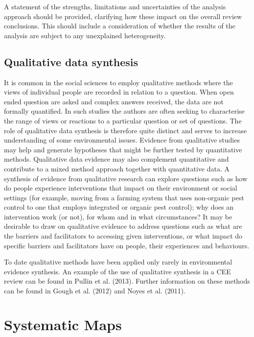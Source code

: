 \documentclass[
  letterpaper,
  DIV=11,
  numbers=noendperiod]{scrreprt}
\begin{document}
A statement of the strengths, limitations and uncertainties of the
analysis approach should be provided, clarifying how these impact on the
overall review conclusions. This should include a consideration of
whether the results of the analysis are subject to any unexplained
heterogeneity.

\subsection{Qualitative data
synthesis}\label{qualitative-data-synthesis}

It is common in the social sciences to employ qualitative methods where
the views of individual people are recorded in relation to a question.
When open ended question are asked and complex answers received, the
data are not formally quantified. In such studies the authors are often
seeking to characterise the range of views or reactions to a particular
question or set of questions. The role of qualitative data synthesis is
therefore quite distinct and serves to increase understanding of some
environmental issues. Evidence from qualitative studies may help and
generate hypotheses that might be further tested by quantitative
methods. Qualitative data evidence may also complement quantitative and
contribute to a mixed method approach together with quantitative data. A
synthesis of evidence from qualitative research can explore questions
such as how do people experience interventions that impact on their
environment or social settings (for example, moving from a farming
system that uses non-organic pest control to one that employs integrated
or organic pest control); why does an intervention work (or not), for
whom and in what circumstances? It may be desirable to draw on
qualitative evidence to address questions such as what are the barriers
and facilitators to accessing given interventions, or what impact do
specific barriers and facilitators have on people, their experiences and
behaviours.

To date qualitative methods have been applied only rarely in
environmental evidence synthesis. An example of the use of qualitative
synthesis in a CEE review can be found in Pullin et al. (2013). Further
information on these methods can be found in Gough et al. (2012) and
Noyes et al. (2011).

\section{Systematic Maps}\label{systematic-maps}
\end{document}

